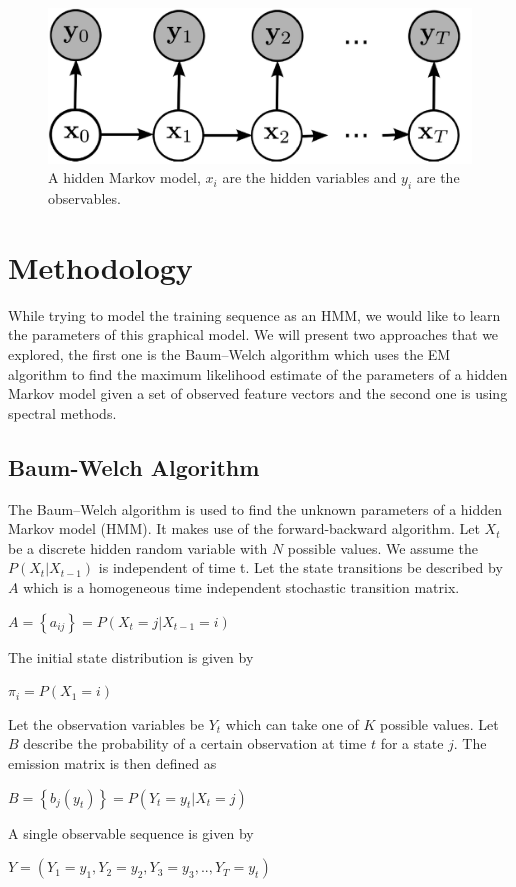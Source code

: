 \documentclass[letterpaper]{article}
\begin{document}
\begin{figure}[h]
\includegraphics[scale=0.2]{"hmm"}
\caption{A hidden Markov model, $x_{i}$ are the hidden variables and $y_{i}$ are the observables.}
\end{figure}

\section{Methodology}

While trying to model the training sequence as an HMM, we would like to learn the parameters of this graphical model. We will present two approaches that we explored, the first one is the Baum–Welch algorithm which uses the EM algorithm to find the maximum likelihood estimate of the parameters of a hidden Markov model given a set of observed feature vectors and the second one is using spectral methods.

\subsection{Baum-Welch Algorithm}

The Baum–Welch algorithm is used to find the unknown parameters of a hidden Markov model (HMM). It makes use of the forward-backward algorithm. Let $X_{t}$ be a discrete hidden random variable with $N$ possible values. We assume the $P(X_{t}|X_{t-1})$ is independent of time t. Let the state transitions be described by $A$ which is a homogeneous time independent stochastic transition matrix. 
\begin{center}
$A = \left\lbrace a_{ij} \right\rbrace = P(X_{t}=j|X_{t-1}=i)$
\end{center}
The initial state distribution is given by
\begin{center}
$\pi_{i} = P(X_{1}=i)$
\end{center}
Let the observation variables be $Y_{t}$ which can take one of $K$ possible values. Let $B$ describe the probability of a certain observation at time $t$ for a state $j$. The emission matrix is then defined as
\begin{center}
$B = \left\lbrace b_{j}(y_{t}) \right\rbrace = P(Y_{t}=y_{t}|X_{t}=j)$
\end{center}
A single observable sequence is given by 
\begin{center}
$Y = (Y_{1}=y_{1},Y_{2}=y_{2},Y_{3}=y_{3},..,Y_{T}=y_{t})$
\end{center}
\end{document}
